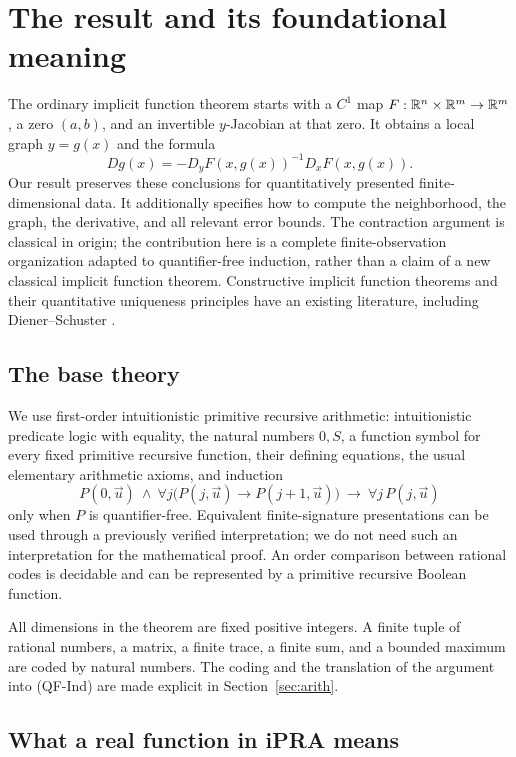 \section{The result and its foundational meaning}

The ordinary implicit function theorem starts with a \(C^1\) map
\(F:\mathbb R^n\times\mathbb R^m\to\mathbb R^m\), a zero \((a,b)\), and an invertible
\(y\)-Jacobian at that zero. It obtains a local graph \(y=g(x)\) and the
formula
\[
 Dg(x)=-D_yF(x,g(x))^{-1}D_xF(x,g(x)).
\]
Our result preserves these conclusions for quantitatively presented
finite-dimensional data. It additionally specifies how to compute the
neighborhood, the graph, the derivative, and all relevant error bounds.
The contraction argument is classical in origin; the contribution here
is a complete finite-observation organization adapted to
quantifier-free induction, rather than a claim of a new classical
implicit function theorem. Constructive implicit function theorems and
their quantitative uniqueness principles have an existing literature,
including Diener--Schuster \cite{diener2011,diener2009}.

\subsection{The base theory}

We use first-order intuitionistic primitive recursive arithmetic:
intuitionistic predicate logic with equality, the natural numbers
\(0,S\), a function symbol for every fixed primitive recursive
function, their defining equations, the usual elementary arithmetic
axioms, and induction
\[
 P(0,\vec u)\ \wedge\
 \forall j\bigl(P(j,\vec u)\to P(j+1,\vec u)\bigr)
 \ \longrightarrow\ \forall j\,P(j,\vec u)
 \tag{QF-Ind}
\]
only when \(P\) is quantifier-free. Equivalent finite-signature
presentations can be used through a previously verified interpretation;
we do not need such an interpretation for the mathematical proof.
An order comparison between rational codes is decidable and can be
represented by a primitive recursive Boolean function.

All dimensions in the theorem are fixed positive integers. A finite
tuple of rational numbers, a matrix, a finite trace, a finite sum, and
a bounded maximum are coded by natural numbers. The coding and the
translation of the argument into (QF-Ind) are made explicit in
Section~\ref{sec:arith}.

\subsection{What a real function in iPRA means}

